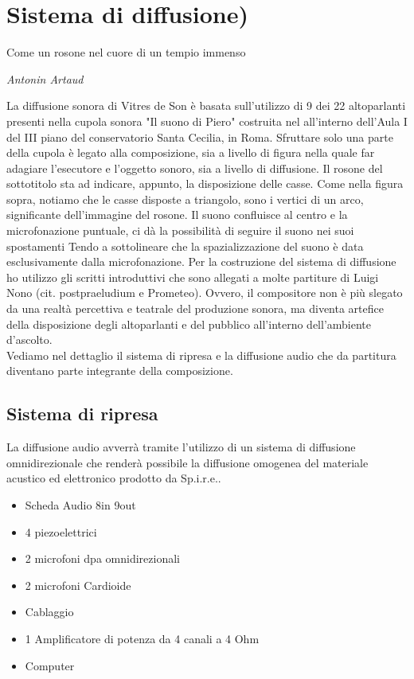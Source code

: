 
\chapter{Sistema di diffusione)}
\label{chp:Sistema di diffusione}

\epigraph{Come un rosone nel cuore di un tempio immenso}{\textit{Antonin Artaud}}

La diffusione sonora di Vitres de Son è basata sull'utilizzo di 9 dei 22 altoparlanti presenti nella cupola sonora "Il suono di Piero" costruita nel all'interno dell'Aula I del III piano del conservatorio Santa Cecilia, in Roma. Sfruttare solo una parte della cupola è legato alla composizione, sia a livello di figura nella quale far adagiare l'esecutore e l'oggetto sonoro, sia a livello di diffusione. Il rosone del sottotitolo sta ad indicare, appunto, la disposizione delle casse. Come nella figura sopra, notiamo che le casse disposte a triangolo, sono i vertici di un arco, significante dell'immagine del rosone. Il suono confluisce al centro e la microfonazione puntuale, ci dà la possibilità di seguire il suono nei suoi spostamenti
Tendo a sottolineare che la spazializzazione del suono è data esclusivamente dalla microfonazione.
Per la costruzione del sistema di diffusione ho utilizzo gli scritti introduttivi che sono allegati a molte partiture di Luigi Nono (cit. postpraeludium e Prometeo). Ovvero, il compositore non è più slegato da una realtà percettiva e teatrale del produzione sonora, ma diventa artefice della disposizione degli altoparlanti e del pubblico all'interno dell'ambiente d'ascolto. \\
Vediamo nel dettaglio il sistema di ripresa e la diffusione audio che da partitura diventano parte integrante della composizione.

\section{Sistema di ripresa}
La diffusione audio avverrà tramite l'utilizzo di un sistema di diffusione omnidirezionale che renderà possibile la diffusione omogenea del materiale acustico ed elettronico prodotto da Sp.i.r.e.. \\

\begin{itemize}
	\item{Scheda Audio 8in 9out}
	\item{4 piezoelettrici}
	\item{2 microfoni dpa omnidirezionali}
	\item{2 microfoni Cardioide}
	\item{Cablaggio}
	\item{1 Amplificatore di potenza da 4 canali a 4 Ohm}
	\item{Computer}
\end{itemize}

